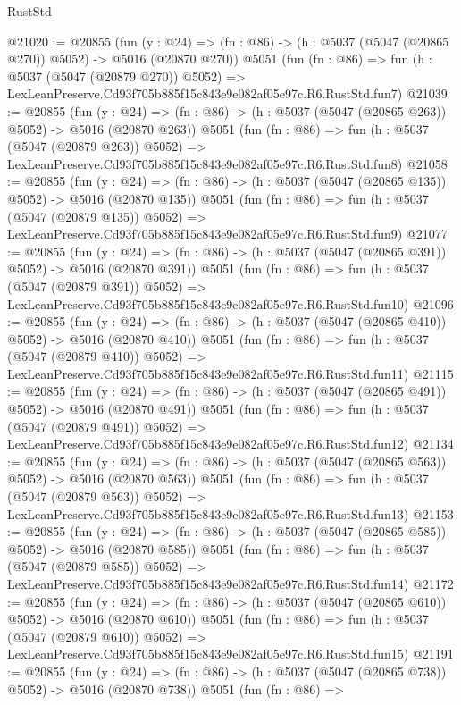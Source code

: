 \begin{lexlean}{RustStd}
\begin{coremodule}
@21020 := @20855
    (fun (y : @24) => (fn : @86) -> (h : @5037 (@5047 (@20865 @270)) @5052) -> @5016 (@20870 @270))
    @5051
    (fun (fn : @86) =>
    fun (h : @5037 (@5047 (@20879 @270)) @5052) =>
    LexLeanPreserve.Cd93f705b885f15c843e9e082af05e97c.R6.RustStd.fun7)
@21039 := @20855
    (fun (y : @24) => (fn : @86) -> (h : @5037 (@5047 (@20865 @263)) @5052) -> @5016 (@20870 @263))
    @5051
    (fun (fn : @86) =>
    fun (h : @5037 (@5047 (@20879 @263)) @5052) =>
    LexLeanPreserve.Cd93f705b885f15c843e9e082af05e97c.R6.RustStd.fun8)
@21058 := @20855
    (fun (y : @24) => (fn : @86) -> (h : @5037 (@5047 (@20865 @135)) @5052) -> @5016 (@20870 @135))
    @5051
    (fun (fn : @86) =>
    fun (h : @5037 (@5047 (@20879 @135)) @5052) =>
    LexLeanPreserve.Cd93f705b885f15c843e9e082af05e97c.R6.RustStd.fun9)
@21077 := @20855
    (fun (y : @24) => (fn : @86) -> (h : @5037 (@5047 (@20865 @391)) @5052) -> @5016 (@20870 @391))
    @5051
    (fun (fn : @86) =>
    fun (h : @5037 (@5047 (@20879 @391)) @5052) =>
    LexLeanPreserve.Cd93f705b885f15c843e9e082af05e97c.R6.RustStd.fun10)
@21096 := @20855
    (fun (y : @24) => (fn : @86) -> (h : @5037 (@5047 (@20865 @410)) @5052) -> @5016 (@20870 @410))
    @5051
    (fun (fn : @86) =>
    fun (h : @5037 (@5047 (@20879 @410)) @5052) =>
    LexLeanPreserve.Cd93f705b885f15c843e9e082af05e97c.R6.RustStd.fun11)
@21115 := @20855
    (fun (y : @24) => (fn : @86) -> (h : @5037 (@5047 (@20865 @491)) @5052) -> @5016 (@20870 @491))
    @5051
    (fun (fn : @86) =>
    fun (h : @5037 (@5047 (@20879 @491)) @5052) =>
    LexLeanPreserve.Cd93f705b885f15c843e9e082af05e97c.R6.RustStd.fun12)
@21134 := @20855
    (fun (y : @24) => (fn : @86) -> (h : @5037 (@5047 (@20865 @563)) @5052) -> @5016 (@20870 @563))
    @5051
    (fun (fn : @86) =>
    fun (h : @5037 (@5047 (@20879 @563)) @5052) =>
    LexLeanPreserve.Cd93f705b885f15c843e9e082af05e97c.R6.RustStd.fun13)
@21153 := @20855
    (fun (y : @24) => (fn : @86) -> (h : @5037 (@5047 (@20865 @585)) @5052) -> @5016 (@20870 @585))
    @5051
    (fun (fn : @86) =>
    fun (h : @5037 (@5047 (@20879 @585)) @5052) =>
    LexLeanPreserve.Cd93f705b885f15c843e9e082af05e97c.R6.RustStd.fun14)
@21172 := @20855
    (fun (y : @24) => (fn : @86) -> (h : @5037 (@5047 (@20865 @610)) @5052) -> @5016 (@20870 @610))
    @5051
    (fun (fn : @86) =>
    fun (h : @5037 (@5047 (@20879 @610)) @5052) =>
    LexLeanPreserve.Cd93f705b885f15c843e9e082af05e97c.R6.RustStd.fun15)
@21191 := @20855
    (fun (y : @24) => (fn : @86) -> (h : @5037 (@5047 (@20865 @738)) @5052) -> @5016 (@20870 @738))
    @5051
    (fun (fn : @86) =>

\end{coremodule}
\end{lexlean}
